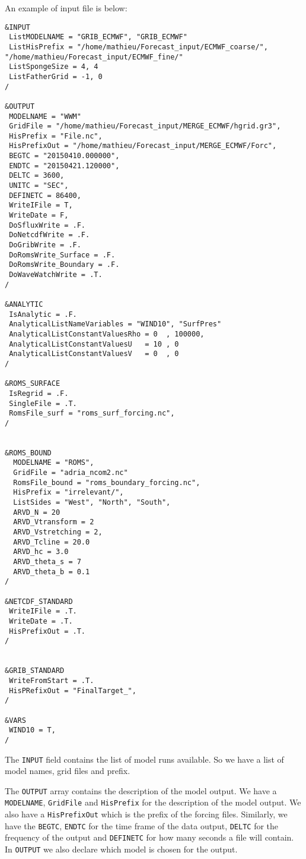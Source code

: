 \documentclass[12pt]{amsart}
\begin{document}
An example of input file is below:
\begin{verbatim}
&INPUT
 ListMODELNAME = "GRIB_ECMWF", "GRIB_ECMWF"
 ListHisPrefix = "/home/mathieu/Forecast_input/ECMWF_coarse/", "/home/mathieu/Forecast_input/ECMWF_fine/"
 ListSpongeSize = 4, 4
 ListFatherGrid = -1, 0
/

&OUTPUT
 MODELNAME = "WWM"
 GridFile = "/home/mathieu/Forecast_input/MERGE_ECMWF/hgrid.gr3",
 HisPrefix = "File.nc",
 HisPrefixOut = "/home/mathieu/Forecast_input/MERGE_ECMWF/Forc",
 BEGTC = "20150410.000000",
 ENDTC = "20150421.120000",
 DELTC = 3600, 
 UNITC = "SEC", 
 DEFINETC = 86400,
 WriteIFile = T,
 WriteDate = F,
 DoSfluxWrite = .F.
 DoNetcdfWrite = .F.
 DoGribWrite = .F.
 DoRomsWrite_Surface = .F.
 DoRomsWrite_Boundary = .F.
 DoWaveWatchWrite = .T.
/

&ANALYTIC
 IsAnalytic = .F.
 AnalyticalListNameVariables = "WIND10", "SurfPres"
 AnalyticalListConstantValuesRho = 0  , 100000,
 AnalyticalListConstantValuesU   = 10 , 0
 AnalyticalListConstantValuesV   = 0  , 0
/

&ROMS_SURFACE
 IsRegrid = .F.
 SingleFile = .T.
 RomsFile_surf = "roms_surf_forcing.nc",
/


&ROMS_BOUND
  MODELNAME = "ROMS",
  GridFile = "adria_ncom2.nc"
  RomsFile_bound = "roms_boundary_forcing.nc",
  HisPrefix = "irrelevant/",
  ListSides = "West", "North", "South", 
  ARVD_N = 20
  ARVD_Vtransform = 2
  ARVD_Vstretching = 2,
  ARVD_Tcline = 20.0
  ARVD_hc = 3.0
  ARVD_theta_s = 7
  ARVD_theta_b = 0.1
/

&NETCDF_STANDARD
 WriteIFile = .T.
 WriteDate = .T.
 HisPrefixOut = .T.
/


&GRIB_STANDARD
 WriteFromStart = .T.
 HisPRefixOut = "FinalTarget_",
/

&VARS
 WIND10 = T, 
/
\end{verbatim}
The {\tt INPUT} field contains the list of model runs available. So we have a list of model names, grid files and prefix.

The {\tt OUTPUT} array contains the description of the model output. We have a {\tt MODELNAME}, {\tt GridFile} and {\tt HisPrefix} for the description of the model output. We also have a {\tt HisPrefixOut} which is the prefix of the forcing files.
Similarly, we have the {\tt BEGTC}, {\tt ENDTC} for the time frame of the data output, {\tt DELTC} for the frequency of the output and {\tt DEFINETC} for how many seconds a file will contain.
In {\tt OUTPUT} we also declare which model is chosen for the output. 
\end{document}
